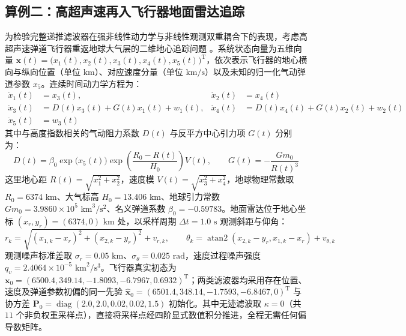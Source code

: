 

\subsection{算例二：高超声速再入飞行器地面雷达追踪}\label{sec:sim-reentry}

为检验完整递推滤波器在强非线性动力学与非线性观测双重耦合下的表现，考虑高超声速弹道飞行器重返地球大气层的二维地心追踪问题 \cite{r06,r08}。系统状态向量为五维向量 $\bm{x}(t) = \bigl(x_1(t), x_2(t), x_3(t), x_4(t), x_5(t)\bigr)^{\mathrm{T}}$，依次表示飞行器的地心横向与纵向位置（单位 $\text{km}$）、对应速度分量（单位 $\text{km/s}$）以及未知的归一化气动弹道参数 $x_5$。连续时间动力学方程为：
\begin{equation}\label{eq:21}
\begin{aligned}
\dot{x}_1(t) &= x_3(t), & \dot{x}_2(t) &= x_4(t) \\
\dot{x}_3(t) &= D(t) x_3(t) + G(t) x_1(t) + w_1(t), & \dot{x}_4(t) &= D(t) x_4(t) + G(t) x_2(t) + w_2(t) \\
\dot{x}_5(t) &= w_3(t)
\end{aligned}
\end{equation}
其中与高度指数相关的气动阻力系数 $D(t)$ 与反平方中心引力项 $G(t)$ 分别为：
\begin{equation}\label{eq:22}
D(t) = \beta_0 \exp\bigl(x_5(t)\bigr) \exp\!\left(\frac{R_0 - R(t)}{H_0}\right) V(t), \qquad G(t) = -\frac{G m_0}{R(t)^3}
\end{equation}
这里地心距 $R(t) = \sqrt{x_1^2 + x_2^2}$，速度模 $V(t) = \sqrt{x_3^2 + x_4^2}$，地球物理常数取 $R_0 = 6374\text{ km}$、大气标高 $H_0 = 13.406\text{ km}$、地球引力常数 $G m_0 = 3.9860 \times 10^5\text{ km}^3/\text{s}^2$、名义弹道系数 $\beta_0 = -0.59783$。地面雷达位于地心坐标 $(x_r, y_r) = (6374, 0)\text{ km}$ 处，以采样周期 $\Delta t = 1.0\text{ s}$ 观测斜距与仰角：
\begin{equation}\label{eq:23}
r_k = \sqrt{(x_{1,k} - x_r)^2 + (x_{2,k} - y_r)^2} + v_{r,k}, \qquad \theta_k = \operatorname{atan2}(x_{2,k} - y_r, x_{1,k} - x_r) + v_{\theta,k}
\end{equation}
观测噪声标准差取 $\sigma_r = 0.05\text{ km}$、$\sigma_\theta = 0.025\text{ rad}$，速度过程噪声强度 $q_v = 2.4064 \times 10^{-5}\text{ km}^2/\text{s}^3$。飞行器真实初态为 $\bm{x}_0 = (6500.4, 349.14, -1.8093, -6.7967, 0.6932)^{\mathrm{T}}$；两类滤波器均采用存在位置、速度及弹道参数初偏的同一先验 $\hat{\bm{x}}_0 = (6501.4, 348.14, -1.7593, -6.8467, 0)^{\mathrm{T}}$ 与协方差 $\bm{P}_0 = \operatorname{diag}(2.0, 2.0, 0.02, 0.02, 1.5)$ 初始化。其中无迹滤波取 $\kappa = 0$（共 $11$ 个非负权重采样点），直接将采样点经四阶显式数值积分推进，全程无需任何偏导数矩阵。

